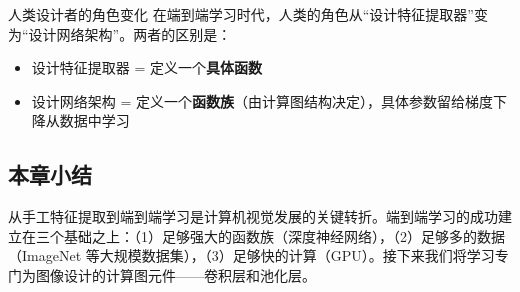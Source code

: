 \begin{knowledgebox}{人类设计者的角色变化}
在端到端学习时代，人类的角色从``设计特征提取器''变为``设计网络架构''。两者的区别是：
\begin{itemize}
    \item 设计特征提取器 = 定义一个\textbf{具体函数}
    \item 设计网络架构 = 定义一个\textbf{函数族}（由计算图结构决定），具体参数留给梯度下降从数据中学习
\end{itemize}
\end{knowledgebox}

\subsection{本章小结}

从手工特征提取到端到端学习是计算机视觉发展的关键转折。端到端学习的成功建立在三个基础之上：（1）足够强大的函数族（深度神经网络），（2）足够多的数据（ImageNet 等大规模数据集），（3）足够快的计算（GPU）。接下来我们将学习专门为图像设计的计算图元件——卷积层和池化层。



